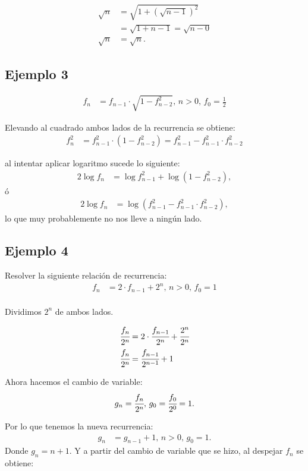\begin{align*}
\sqrt{n}&=\sqrt{1+\left(\sqrt{n-1}\right)^2}\\
&=\sqrt{1+n-1}=\sqrt{n-0}\\
\sqrt{n}&=\sqrt{n}.
\end{align*}


\subsection{Ejemplo 3}
\begin{align*}
f_n&=f_{n-1}\cdot \sqrt{1-f_{n-2}^2},\,n>0,\,f_0=\frac{1}{2}
\end{align*}

Elevando al cuadrado ambos lados de la recurrencia se obtiene:
\begin{align*}
f_n^2&=f_{n-1}^2\cdot(1-f_{n-2}^2)=f_{n-1}^2-f_{n-1}^2\cdot f_{n-2}^2
\end{align*}

al intentar aplicar logaritmo sucede lo siguiente:
\begin{align*}
2\log f_n&=\log f_{n-1}^2+\log(1-f_{n-2}^2),
\end{align*}
ó
\begin{align*}
2\log f_n&=\log(f_{n-1}^2-f_{n-1}^2\cdot f_{n-2}^2),
\end{align*}
lo que muy probablemente no nos lleve a ningún lado.

\subsection{Ejemplo 4}
Resolver la siguiente relación de recurrencia:
\begin{align*}
f_n&=2\cdot f_{n-1}+2^n,\,n>0,\,f_0=1\\
\end{align*}

Dividimos $2^n$ de ambos lados.

\begin{align*}
\cfrac{f_n}{2^n}&=2\cdot\cfrac{f_{n-1}}{2^n} +\cfrac{2^n}{2^n}\\
\cfrac{f_n}{2^n}&=\cfrac{f_{n-1}}{2^{n-1}}+1
\end{align*}

Ahora hacemos el cambio de variable:
$$g_n=\cfrac{f_n}{2^n},\,g_0=\cfrac{f_0}{2^0}=1.$$

Por lo que tenemos la nueva recurrencia:
\begin{align*}
g_n&=g_{n-1}+1,\,n>0,\,g_0=1.
\end{align*}
Donde $g_n=n+1$.
Y a partir del cambio de variable que se hizo, al despejar $f_n$ se obtiene:

